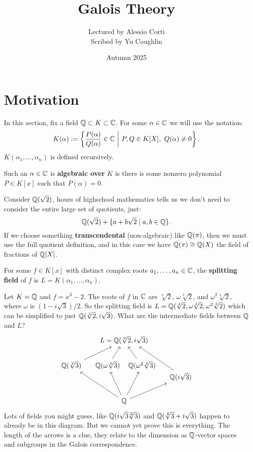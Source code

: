 \documentclass{article}
\begin{document}
\title{Galois Theory}
\author{Lectured by Alessio Corti \\
Scribed by Yu Coughlin}
\date{Autumn 2025}

\maketitle

\tableofcontents

\section{Motivation}

In this section, fix a field $\mathbb{Q}\subset K \subset \mathbb{C}$. For some $\alpha\in \mathbb{C}$ we will use the notation: \[
K(\alpha) := \left\{
    \frac{P(\alpha)}{Q(\alpha)} \in \bC \ \middle| \ P,Q\in K[X], \ Q(\alpha)\neq 0
\right\}.
\]
$K(\alpha_1,\ldots,\alpha_n)$ is defined recursively.

\begin{definition}
    Such an $\alpha\in \mathbb{C}$ is \textbf{algebraic over} $K$ is there is some nonzero polynomial $P\in K[x]$ such that $P(\alpha) = 0$.
\end{definition}

Consider $\mathbb{Q}(\sqrt{2})$, hours of highschool mathematics tells us we don't need to consider the entire large set of quotients, just: \[
\mathbb{Q}(\sqrt{2}) + \{a + b\sqrt{2} \mid a,b\in\mathbb{Q}\}.
\]
If we choose something \textbf{transcendental} (non-algebraic) like $\mathbb{Q}(\pi)$, then we must use the full quotient definition, and in this case we have $\mathbb{Q}(\pi)\cong \mathbb{Q}(X)$ the field of fractions of $\mathbb{Q}[X]$.

\begin{definition}
    For some $f\in K[x]$ with distinct complex roots $a_1,\ldots,a_n\in\mathbb{C}$, the \textbf{splitting field} of $f$ is $L=K(\alpha_1,\ldots,\alpha_n)$.
\end{definition}

Let $K=\mathbb{Q}$ and $f=x^3-2$. The roots of $f$ in $\mathbb{C}$ are $\sqrt[3]{2}$, $\omega \sqrt[3]{2}$, and $\omega^2\sqrt[3]{2}$, where $\omega$ is $(1-i\sqrt{3})/2$. So the splitting field is $L=\mathbb{Q}(\sqrt[3]{2},\omega\sqrt[3]{2},\omega^2\sqrt[3]{2})$ which can be simplified to just $\mathbb{Q}(\sqrt[3]{2},i\sqrt{3})$. What are the intermediate fields between $\mathbb{Q}$ and $L$? 
\vspace{-10pt}
\[
\begin{tikzcd}[column sep=small]
& &[-50pt] L = \bQ(\sqrt[3]{2},i\sqrt{3})\\
\bQ(\sqrt[2]{3}) \arrow[urr] 
& \bQ(\omega\sqrt[2]{3}) \arrow[ur] 
& &[-50pt] \bQ(\omega^2\sqrt[2]{3}) \arrow[ul]\\[-20pt]
& & & & \bQ(i\sqrt{3})\arrow[uull, end anchor={[xshift=-4ex]south east}]\\
& & \bQ \arrow[uull] \arrow[uul] \arrow[uur] \arrow[urr]
\end{tikzcd}
\] Lots of fields you might guess, like $\mathbb{Q}(i\sqrt{3}\sqrt[2]{3})$ and $\mathbb{Q}(\sqrt[2]{3} + i\sqrt{3})$ happen to already be in this diagram. But we cannot yet prove this is everything. The length of the arrows is a clue, they relate to the dimension as $\mathbb{Q}$-vector spaces and subgroups in the Galois correspondence.
\end{document}
